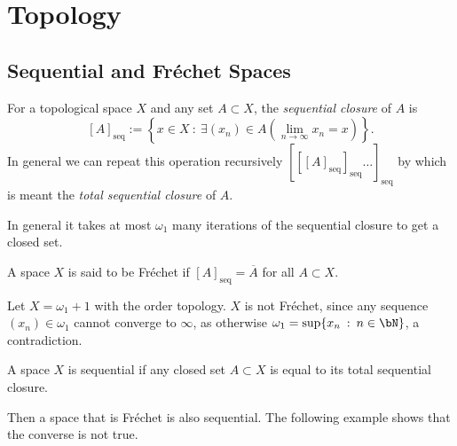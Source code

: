 \documentclass{article}
\newcommand{\seqcl}[1]{{[#1]_{\text{seq}}}}
\begin{document}
\section{Topology}
\subsection{Sequential and Fréchet Spaces}

\begin{defn}
    For a topological space \(X\) and any set \(A \subset X\), the \textit{sequential closure} of \(A\) is  
    \[
        \seqcl{A} := \left\{x \in X \: : \: \exists (x_n) \in A \left(\lim_{n\to \infty} x_n = x\right) \right\}.
    \]
    In general we can repeat this operation recursively \(\seqcl{\seqcl{\seqcl{A}}\dots}\) by which is meant the \textit{total sequential closure} of \(A\).
    
\end{defn}

\begin{fact}
    In general it takes at most \(\omega_1\) many iterations of the sequential closure to get a closed set. 
\end{fact}

\begin{defn}
    A space \(X\) is said to be Fréchet if \(\seqcl{A} = \overline{A}\) for all \(A \subset X\).
\end{defn}
\begin{exam}
    Let \(X = \omega_1 + 1\) with the order topology. \(X\) is not Fréchet, since any sequence \((x_n) \in \omega_1\) cannot converge to \(\infty\), as otherwise \(\omega_1 = \sup\{x_n \: : \: n \in \bN\}\), a contradiction.
\end{exam}
\begin{defn}
    A space \(X\) is sequential if any closed set \(A \subset X\) is equal to its total sequential closure.
\end{defn}
Then a space that is Fréchet is also sequential. The following example shows that the converse is not true.
\end{document}

